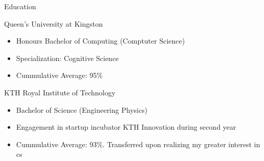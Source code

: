 \documentclass{article}
\newlength{\tabin}
\newlength{\secsep}
\newcommand{\lineunder}{\vspace*{-8pt} \\ \hspace*{4pt} \hrulefill \\ \vspace*{-10pt}}
\newenvironment{tabbedsection}[1]{
	\begin{list}{}{
			\setlength{\itemsep}{0pt}
			\setlength{\labelsep}{0pt}
			\setlength{\labelwidth}{0pt}
			\setlength{\leftmargin}{\tabin}
			\setlength{\rightmargin}{\tabin}
			\setlength{\listparindent}{0pt}
			\setlength{\parsep}{0pt}
			\setlength{\parskip}{0pt}
			\setlength{\partopsep}{0pt}
			\setlength{\topsep}{#1}
		}
		\item[]
	}{\end{list}}
\newenvironment{resume_section}[1]{
	\filbreak
	\vspace{2\secsep}
	\textsc{\large#1}
	\lineunder
	\begin{tabbedsection}{\secsep}
	}{\end{tabbedsection}}
\newenvironment{resume_subsection}[2][]{
	\textbf{#2} \hfill {\footnotesize #1}
	\begin{tabbedsection}{0.5\secsep}
	}{\end{tabbedsection}}
\newenvironment{subitems}{
	\renewcommand{\labelitemi}{-}
	\begin{itemize}
		\setlength{\labelsep}{1em}
	}{\end{itemize}}
\begin{document}
		
	\begin{resume_section}{Education}
		\begin{resume_subsection}{Queen's University at Kingston}
			\begin{subitems}
				\item Honours Bachelor of Computing (Comptuter Science)
				\item Specialization: Cognitive Science
				\item Cummulative Average: 95\%
			\end{subitems}
		\end{resume_subsection}
		
		
		\begin{resume_subsection}{KTH Royal Institute of Technology}
			\begin{subitems}
				\item Bachelor of Science (Engineering Physics)
				\item Engagement in startup incubator KTH Innovation during second year
				\item Cummulative Average: 93\%. Transferred upon realizing my greater interest in cs
			\end{subitems}
		\end{resume_subsection}
	\end{resume_section}
\end{document}
